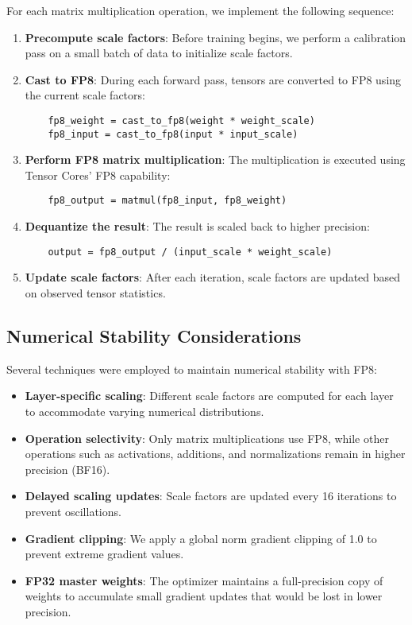 For each matrix multiplication operation, we implement the following sequence:

\begin{enumerate}
    \item \textbf{Precompute scale factors}: Before training begins, we perform a calibration pass on a small batch of data to initialize scale factors.
    \item \textbf{Cast to FP8}: During each forward pass, tensors are converted to FP8 using the current scale factors:
    \begin{verbatim}
    fp8_weight = cast_to_fp8(weight * weight_scale)
    fp8_input = cast_to_fp8(input * input_scale)
    \end{verbatim}
    
    \item \textbf{Perform FP8 matrix multiplication}: The multiplication is executed using Tensor Cores' FP8 capability:
    \begin{verbatim}
    fp8_output = matmul(fp8_input, fp8_weight)
    \end{verbatim}
    
    \item \textbf{Dequantize the result}: The result is scaled back to higher precision:
    \begin{verbatim}
    output = fp8_output / (input_scale * weight_scale)
    \end{verbatim}
    
    \item \textbf{Update scale factors}: After each iteration, scale factors are updated based on observed tensor statistics.
\end{enumerate}

\subsection{Numerical Stability Considerations}\label{sec:numerical_stability}

Several techniques were employed to maintain numerical stability with FP8:

\begin{itemize}
    \item \textbf{Layer-specific scaling}: Different scale factors are computed for each layer to accommodate varying numerical distributions.
    \item \textbf{Operation selectivity}: Only matrix multiplications use FP8, while other operations such as activations, additions, and normalizations remain in higher precision (BF16).
    \item \textbf{Delayed scaling updates}: Scale factors are updated every 16 iterations to prevent oscillations.
    \item \textbf{Gradient clipping}: We apply a global norm gradient clipping of 1.0 to prevent extreme gradient values.
    \item \textbf{FP32 master weights}: The optimizer maintains a full-precision copy of weights to accumulate small gradient updates that would be lost in lower precision.
\end{itemize}

